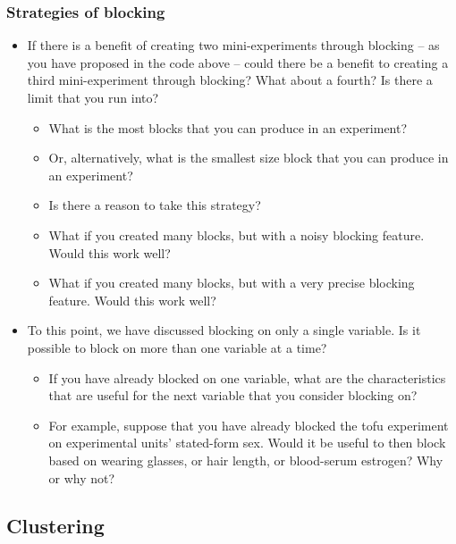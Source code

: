 \documentclass[
]{article}
\providecommand{\tightlist}{%
  \setlength{\itemsep}{0pt}\setlength{\parskip}{0pt}}
\theoremstyle{definition}
\theoremstyle{definition}
\theoremstyle{definition}
\theoremstyle{definition}
\theoremstyle{remark}
\begin{document}
\subsubsection{Strategies of blocking}\label{strategies-of-blocking}

\begin{itemize}
\item
  If there is a benefit of creating two mini-experiments through blocking -- as you have proposed in the code above -- could there be a benefit to creating a third mini-experiment through blocking? What about a fourth? Is there a limit that you run into?

  \begin{itemize}
  \tightlist
  \item
    What is the most blocks that you can produce in an experiment?
  \item
    Or, alternatively, what is the smallest size block that you can produce in an experiment?
  \item
    Is there a reason to take this strategy?
  \item
    What if you created many blocks, but with a noisy blocking feature. Would this work well?
  \item
    What if you created many blocks, but with a very precise blocking feature. Would this work well?
  \end{itemize}
\item
  To this point, we have discussed blocking on only a single variable. Is it possible to block on more than one variable at a time?

  \begin{itemize}
  \tightlist
  \item
    If you have already blocked on one variable, what are the characteristics that are useful for the next variable that you consider blocking on?
  \item
    For example, suppose that you have already blocked the tofu experiment on experimental units' stated-form sex. Would it be useful to then block based on wearing glasses, or hair length, or blood-serum estrogen? Why or why not?
  \end{itemize}
\end{itemize}

\subsection{Clustering}\label{clustering}
\end{document}
